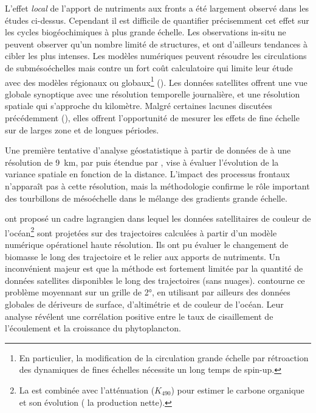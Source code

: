 
L'effet \emph{local} de l'apport de nutriments aux fronts a été largement observé dans les études ci-dessus.
Cependant il est difficile de quantifier précisemment cet effet sur les cycles biogéochimiques à plus grande échelle.
Les observations in-situ ne peuvent observer qu'un nombre limité de structures, et ont d'ailleurs tendances à cibler les plus intenses.
Les modèles numériques peuvent résoudre les circulations de submésoéchelles mais contre un fort coût calculatoire qui limite leur étude avec des modèles régionaux ou globaux\footnote{%
  En particulier, la modification de la circulation grande échelle par rétroaction des dynamiques de fines échelles nécessite un long temps de spin-up.
} (\cite{kessouri_2020,hewitt_2022}).
Les données satellites offrent une vue globale synoptique avec une résolution temporelle journalière, et une résolution spatiale qui s'approche du kilomètre.
Malgré certaines lacunes discutées précédemment (), elles offrent l'opportunité de mesurer les effets de fine échelle sur de larges zone et de longues périodes.

Une première tentative d'analyse géostatistique à partir de données de  à une résolution de \qty{9}{\km}, par \textcite{doney_2003} puis étendue par \textcite{glover_2018}, vise à évaluer l'évolution de la variance spatiale en fonction de la distance.
L'impact des processus frontaux n'apparaît pas à cette résolution, mais la méthodologie confirme le rôle important des tourbillons de mésoéchelle dans le mélange des gradients grande échelle.

\Textcite{jonsson_2011} ont proposé un cadre lagrangien dans lequel les données satellitaires de couleur de l'océan\footnote{%
  La  est combinée avec l'atténuation (\(K_{490}\)) pour estimer le carbone organique et son évolution ( la production nette).
} sont projetées sur des trajectoires calculées à partir d'un modèle numérique opérationel haute résolution.
Ils ont pu évaluer le changement de biomasse le long des trajectoire et le relier aux apports de nutriments.
Un inconvénient majeur est que la méthode est fortement limitée par la quantité de données satellites disponibles le long des trajectoires (sans nuages).
\Textcite{zhang_2019} contourne ce problème moyennant sur un grille de \ang{2}, en utilisant par ailleurs des données globales de dériveurs de surface, d'altimétrie et de couleur de l'océan.
Leur analyse révélent une corrélation positive entre le taux de cisaillement de l'écoulement et la croissance du phytoplancton.

